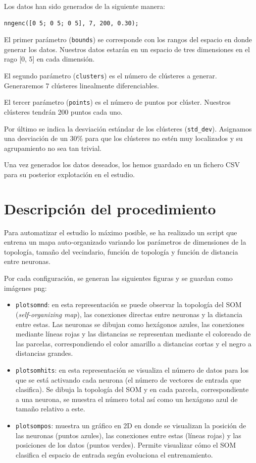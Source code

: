 \documentclass[a4paper,12pt,titlepage]{article}
\begin{document}
Los datos han sido generados de la siguiente manera:

\begin{lstlisting}
nngenc([0 5; 0 5; 0 5], 7, 200, 0.30);
\end{lstlisting}

El primer parámetro (\lstinline|bounds|) se corresponde con los rangos del espacio en donde generar los datos. Nuestros datos estarán en un espacio de tres dimensiones en el rago [0, 5] en cada dimensión.

El segundo parámetro (\lstinline|clusters|) es el número de clústeres a generar. Generaremos 7 clústeres linealmente diferenciables.

El tercer parámetro (\lstinline|points|) es el número de puntos por clúster. Nuestros clústeres tendrán 200 puntos cada uno.

Por último se indica la desviación estándar de los clústeres (\lstinline|std_dev|). Asignamos una desviación de un 30\% para que los clústeres no estén muy localizados y su agrupamiento no sea tan trivial.

Una vez generados los datos deseados, los hemos guardado en un fichero CSV para su posterior explotación en el estudio. 

\section{Descripción del procedimiento}

Para automatizar el estudio lo máximo posible, se ha realizado un script que entrena un mapa auto-organizado variando los parámetros de dimensiones de la topología, tamaño del vecindario, función de topología y función de distancia entre neuronas. 

Por cada configuración, se generan las siguientes figuras y se guardan como imágenes png:

\begin{itemize}[noitemsep]
	\item \lstinline|plotsomnd|: en esta representación se puede observar la topología del SOM (\textit{self-organizing map}), las conexiones directas entre neuronas y la distancia entre estas. Las neuronas se dibujan como hexágonos azules, las conexiones mediante líneas rojas y las distancias se representan mediante el coloreado de las parcelas, correspondiendo el color amarillo a distancias cortas y el negro a distancias grandes. \citep{matlab:plotsomnd}
	\item \lstinline|plotsomhits|: en esta representación se visualiza el número de datos para los que se está activando cada neurona (el número de vectores de entrada que clasifica). Se dibuja la topología del SOM y en cada parcela, correspondiente a una neurona, se muestra el número total así como un hexágono azul de tamaño relativo a este. \citep{matlab:plotsomhits}
	\item \lstinline|plotsompos|: muestra un gráfico en 2D en donde se visualizan la posición de las neuronas (puntos azules), las conexiones entre estas (líneas rojas) y las posiciones de los datos (puntos verdes). Permite visualizar cómo el SOM clasifica el espacio de entrada según evoluciona el entrenamiento. \citep{matlab:plotsompos}
\end{itemize}
\end{document}
